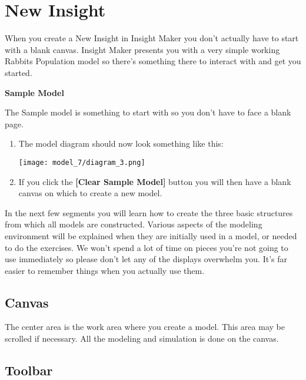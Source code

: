 \documentclass[]{memoir}
\makeatletter
\def\maxwidth{\ifdim\Gin@nat@width>\linewidth\linewidth
\else\Gin@nat@width\fi}
\let\Oldincludegraphics\includegraphics
\renewcommand{\includegraphics}[1]{\Oldincludegraphics[width=\maxwidth]{#1}}
\newcommand{\p}[1]{\textbf{{[}#1{]}}}
\makeatother
\begin{document}
\section{New Insight}

When you create a New Insight in Insight Maker you don't actually have
to start with a blank canvas. Insight Maker presents you with a very
simple working Rabbits Population model so there's something there to
interact with and get you started.

\FloatBarrier 

\begin{oframed}\textbf{Sample Model} 

 The Sample model is something to start with so you don't have to face a blank page.

\begin{enumerate}
\item The model diagram should now look something like this: \par \begin{minipage}{\linewidth}  \centering \texttt{[image: model\_7/diagram\_3.png]}
\end{minipage}
\item 

If you click the \p{Clear Sample Model} button you will then have a blank canvas on which to create a new model.



\end{enumerate} \end{oframed}

In the next few segments you will learn how to create the three basic
structures from which all models are constructed. Various aspects of the
modeling environment will be explained when they are initially used in a
model, or needed to do the exercises. We won't spend a lot of time on
pieces you're not going to use immediately so please don't let any of
the displays overwhelm you. It's far easier to remember things when you
actually use them.

\subsection{Canvas}

The center area is the work area where you create a model. This area may
be scrolled if necessary. All the modeling and simulation is done on the
canvas.

\subsection{Toolbar}
\end{document}

